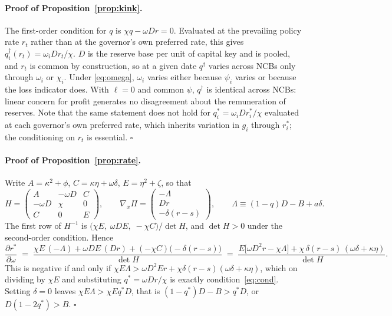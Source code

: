 \documentclass[11pt]{article}
\theoremstyle{plain}
\begin{document}
\paragraph{Proof of Proposition~\ref{prop:kink}.}
The first-order condition for $q$ is $\chi q - \omega D r = 0$. Evaluated at the prevailing policy rate $r_t$ rather than at the governor's own preferred rate, this gives $q_i^\dagger(r_t) = \omega_i D r_t/\chi$. $D$ is the reserve base per unit of capital key and is pooled, and $r_t$ is common by construction, so at a given date $q^\dagger$ varies across NCBs only through $\omega_i$ or $\chi_i$. Under \eqref{eq:omega}, $\omega_i$ varies either because $\psi_i$ varies or because the loss indicator does. With $\ell=0$ and common $\psi$, $q^\dagger$ is identical across NCBs: linear concern for profit generates no disagreement about the remuneration of reserves. Note that the same statement does not hold for $q_i^*=\omega_i D r_i^*/\chi$ evaluated at each governor's own preferred rate, which inherits variation in $g_i$ through $r_i^*$; the conditioning on $r_t$ is essential. \hfill$\square$

\paragraph{Proof of Proposition~\ref{prop:rate}.}
Write $A=\kappa^2+\phi$, $C=\kappa\eta+\omega\delta$, $E=\eta^2+\zeta$, so that
\[
H=\begin{pmatrix} A & -\omega D & C \\ -\omega D & \chi & 0 \\ C & 0 & E\end{pmatrix},\qquad
\nabla_x\Pi=\begin{pmatrix} -\Lambda \\ D r \\ -\delta(r-s)\end{pmatrix},\qquad \Lambda \equiv (1-q)D - B + a\delta .
\]
The first row of $H^{-1}$ is $\bigl(\chi E,\; \omega D E,\; -\chi C\bigr)/\det H$, and $\det H>0$ under the second-order condition. Hence
\[
\frac{\partial r^*}{\partial\omega} \;=\; \frac{\chi E\,(-\Lambda) + \omega D E\,(D r) + (-\chi C)\bigl(-\delta(r-s)\bigr)}{\det H}
\;=\; \frac{E\bigl[\omega D^2 r - \chi\Lambda\bigr] + \chi\,\delta(r-s)\,(\omega\delta+\kappa\eta)}{\det H}.
\]
This is negative if and only if $\chi E\Lambda > \omega D^2 E r + \chi\delta(r-s)(\omega\delta+\kappa\eta)$, which on dividing by $\chi E$ and substituting $q^* = \omega D r/\chi$ is exactly condition~\eqref{eq:cond}. Setting $\delta=0$ leaves $\chi E\Lambda > \chi E q^* D$, that is $(1-q^*)D-B > q^*D$, or $D(1-2q^*)>B$. \hfill$\square$
\end{document}
